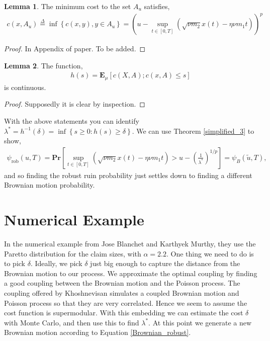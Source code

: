 \documentclass[12pt]{article}
\renewcommand{\Pr}{\textbf{Pr}}
\newcommand{\E}{\textbf{E}}
\newcommand{\define}{\overset{\Delta}{=}}
\theoremstyle{definition}
\theoremstyle{definition}
\newtheorem{lemma}{Lemma}
\theoremstyle{definition}
\begin{document}
\begin{lemma} The minimum cost to the set $A_u$ satisfies,
\begin{align*}
c(x,A_u) \define\inf\left\{c(x,y),y\in A_u\right\} = \left(u-\sup_{t\in[0,T]}\left(\sqrt{\nu m_2}x(t)-\eta \nu m_1t\right)\right)^p
\end{align*}
\begin{proof}
In Appendix of paper. To be added.
\end{proof}
\end{lemma}

\begin{lemma} The function,
\begin{align*}
h(s)=\E_{\mu}\left[c(X,A); c(x,A)\leq s\right]
\end{align*}
is continuous. 
\end{lemma}
\begin{proof} Supposedly it is clear by inspection.
\end{proof}

With the above statements you can identify $\lambda^*=h^{-1}(\delta)=\inf\left\{s\geq 0 : h(s)\geq \delta\right\}$. We can use Theorem \ref{simplified_3} to show,
\begin{align}
\psi_{\text{rob}}(u,T)= \Pr\left[\sup_{t\in[0,T]} \left(\sqrt{\nu m_2}x(t)-\eta \nu m_1t\right)>u -\left(\frac{1}{\lambda^*}\right)^{1/p}\right] = \psi_B(\tilde u, T),\label{Brownian_robust}
\end{align}
and so finding the robust ruin probability just settles down to finding a different Brownian motion probability. 

\section*{Numerical Example}
In the numerical example from Jose Blanchet and Karthyek Murthy, they use the Paretto distribution for the claim sizes, with $\alpha=2.2$. One thing we need to do is to pick $\delta$. Ideally, we pick $\delta$ just big enough to capture the distance from the Brownian motion to our process. We approximate the optimal coupling by finding a good coupling between the Brownian motion and the Poisson process. The coupling offered by Khoshnevisan simulates a coupled Brownian motion and Poisson process so that they are very correlated. Hence we seem to assume the cost function is supermodular. With this embedding we can estimate the cost $\delta$ with Monte Carlo, and then use this to find $\lambda^*$. At this point we generate a new Brownian motion according to Equation \ref{Brownian_robust}. 
\end{document}
